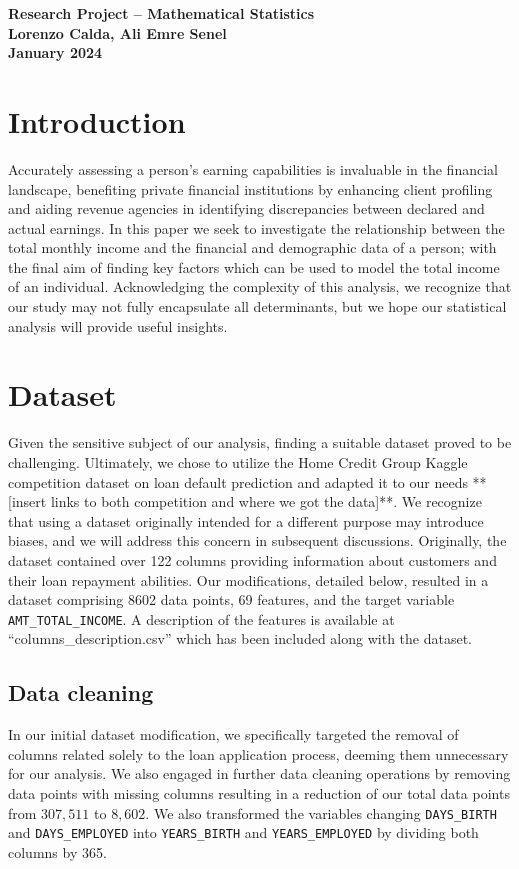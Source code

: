 \documentclass[12pt]{article}
\begin{document}
\begin{center}
  \textbf{Research Project – Mathematical Statistics}\\[0pt]
  \textbf{Lorenzo Calda, Ali Emre Senel}\\[0pt]
\textbf{January 2024}
\end{center}

\section{Introduction}
Accurately assessing a person's earning capabilities is invaluable in the financial landscape, benefiting private financial institutions by enhancing client profiling and aiding revenue agencies in identifying discrepancies between declared and actual earnings. In this paper we seek to investigate the relationship between the total monthly income and the financial and demographic data of a person; with the final aim of finding key factors which can be used to model the total income of an individual. Acknowledging the complexity of this analysis, we recognize that our study may not fully encapsulate all determinants, but we hope our statistical analysis will provide useful insights.

\section{Dataset}
Given the sensitive subject of our analysis, finding a suitable dataset proved to be challenging. Ultimately, we chose to utilize the Home Credit Group Kaggle competition dataset on loan default prediction and adapted it to our needs **[insert links to both competition and where we got the data]**. We recognize that using a dataset originally intended for a different purpose may introduce biases, and we will address this concern in subsequent discussions. Originally, the dataset contained over 122 columns providing information about customers and their loan repayment abilities. Our modifications, detailed below, resulted in a dataset comprising 8602 data points, 69 features, and the target variable \verb|AMT_TOTAL_INCOME|. A description of the features is available at ``columns\_description.csv'' which has been included along with the dataset.

\subsection{Data cleaning}
In our initial dataset modification, we specifically targeted the removal of columns related solely to the loan application process, deeming them unnecessary for our analysis. We also engaged in further data cleaning operations by removing data points with missing columns resulting in a reduction of our total data points from $307,511$ to $8,602$. We also transformed the variables changing \verb|DAYS_BIRTH| and \verb|DAYS_EMPLOYED| into \verb|YEARS_BIRTH| and \verb|YEARS_EMPLOYED| by dividing both columns by 365.
\end{document}
